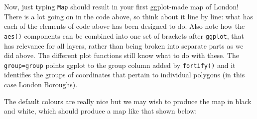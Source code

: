 \documentclass[]{article}
\newenvironment{Shaded}{}{}
\newcommand{\KeywordTok}[1]{\textcolor[rgb]{0.00,0.44,0.13}{\textbf{{#1}}}}
\newcommand{\DataTypeTok}[1]{\textcolor[rgb]{0.56,0.13,0.00}{{#1}}}
\newcommand{\StringTok}[1]{\textcolor[rgb]{0.25,0.44,0.63}{{#1}}}
\newcommand{\NormalTok}[1]{{#1}}
\begin{document}
\begin{Shaded}
\end{Shaded}
Now, just typing \texttt{Map} should result in your first ggplot-made
map of London! There is a lot going on in the code above, so think about
it line by line: what has each of the elements of code above has been
designed to do. Also note how the \texttt{aes()} components can be
combined into one set of brackets after \texttt{ggplot}, that has
relevance for all layers, rather than being broken into separate parts
as we did above. The different plot functions still know what to do with
these. The \texttt{group=group} points ggplot to the group column added
by \texttt{fortify()} and it identifies the groups of coordinates that
pertain to individual polygons (in this case London Boroughs).

The default colours are really nice but we may wish to produce the map
in black and white, which should produce a map like that shown below:
\end{document}
